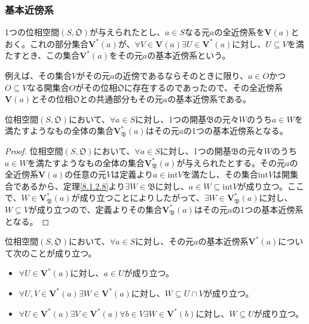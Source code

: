 \documentclass[dvipdfmx]{jsarticle}
\begin{document}
\subsubsection{基本近傍系}%
\begin{dfn}
1つの位相空間$\left( S,\mathfrak{O} \right)$が与えられたとし、$a \in S$なる元$a$の全近傍系を$\mathbf{V}(a)$とおく。これの部分集合$\mathbf{V}^{*}(a)$が、$\forall V \in \mathbf{V}(a)\exists U \in \mathbf{V}^{*}(a)$に対し、$U \subseteq V$を満たすとき、この集合$\mathbf{V}^{*}(a)$をその元$a$の基本近傍系という。
\end{dfn}\par
例えば、その集合$V$がその元$a$の近傍であるならそのときに限り、$a \in O$かつ$O \subseteq V$なる開集合$O$がその位相$\mathfrak{O}$に存在するのであったので、その全近傍系$\mathbf{V}(a)$とその位相$\mathfrak{O}$との共通部分もその元$a$の基本近傍系である。
\begin{thm}\label{8.1.2.11}
位相空間$\left( S,\mathfrak{O} \right)$において、$\forall a \in S$に対し、1つの開基$\mathfrak{B}$の元々$W$のうち$a \in W$を満たすようなもの全体の集合$\mathbf{V}_{\mathfrak{B}}^{*}(a)$はその元$a$の1つの基本近傍系となる。
\end{thm}
\begin{proof}
位相空間$\left( S,\mathfrak{O} \right)$において、$\forall a \in S$に対し、1つの開基$\mathfrak{B}$の元々$W$のうち$a \in W$を満たすようなもの全体の集合$\mathbf{V}_{\mathfrak{B}}^{*}(a)$が与えられたとする。その元$a$の全近傍系$\mathbf{V}(a)$の任意の元$V$は定義より$a \in {\mathrm{int}}V$を満たし、その集合${\mathrm{int}}V$は開集合であるから、定理\ref{8.1.2.8}より$\exists W \in \mathfrak{B}$に対し、$a \in W \subseteq {\mathrm{int}}V$が成り立つ。ここで、$W \in \mathbf{V}_{\mathfrak{B}}^{*}(a)$が成り立つことによりしたがって、$\exists W \in \mathbf{V}_{\mathfrak{B}}^{*}(a)$に対し、$W \subseteq V$が成り立つので、定義よりその集合$\mathbf{V}_{\mathfrak{B}}^{*}(a)$はその元$a$の1つの基本近傍系となる。
\end{proof}
\begin{thm}\label{8.1.2.12}
位相空間$\left( S,\mathfrak{O} \right)$において、$\forall a \in S$に対し、その元$a$の基本近傍系$\mathbf{V}^{*}(a)$について次のことが成り立つ。
\begin{itemize}
\item
  $\forall U \in \mathbf{V}^{*}(a)$に対し、$a \in U$が成り立つ。
\item
  $\forall U,V \in \mathbf{V}^{*}(a)\exists W \in \mathbf{V}^{*}(a)$に対し、$W \subseteq U \cap V$が成り立つ。
\item
  $\forall U \in \mathbf{V}^{*}(a)\exists V \in \mathbf{V}^{*}(a)\forall b \in V\exists W \in \mathbf{V}^{*}(b)$に対し、$W \subseteq U$が成り立つ。
\end{itemize}
\end{thm}
\end{document}
